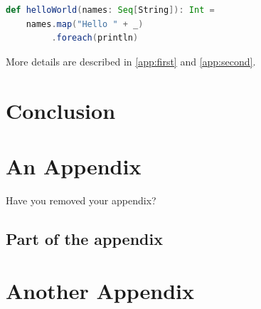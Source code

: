 \documentclass{yqart}
\begin{document}
\begin{lstlisting}[language=scala, label={lst:helloworld}, caption={A Scala program for saying hello to everyone}, float]
def helloWorld(names: Seq[String]): Int =
    names.map("Hello " + _)
         .foreach(println)
\end{lstlisting}

More details are described in \autoref{app:first} and \autoref{app:second}.

\section{Conclusion}
\kant[2]

  
  

\appendix

\section{An Appendix}\label{app:first}
Have you removed your appendix?

\subsection{Part of the appendix}
\kant[3]

\section{Another Appendix}\label{app:second}
\kant[4-6]
\end{document}
